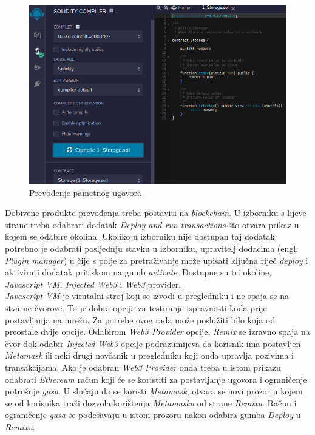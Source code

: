 \documentclass[times, utf8, zavrsni]{fer}
\begin{document}
\begin{figure}[ht]
  \includegraphics[width=\textwidth]{remixcompiled.png}
  \caption{Prevođenje pametnog ugovora}
  \centering
  \vfill
\end{figure}

\pagebreak

Dobivene produkte prevođenja treba postaviti na \emph{blockchain}. U izborniku s lijeve strane treba odabrati dodatak \emph{Deploy and run transactions} što otvara
prikaz u kojem se odabire okolina. Ukoliko u izborniku nije dostupan taj dodatak potrebno je odabrati posljednju stavku u izborniku, upravitelj dodacima (engl. \emph{Plugin manager})
u čije s polje za pretraživanje može upisati ključna riječ \emph{deploy} i aktivirati dodatak pritiskom na gumb \emph{activate}.
Dostupne su tri okoline, \emph{Javascript VM, Injected Web3} i \emph{Web3} provider. \\
\emph{Javascript VM} je virutalni stroj koji se izvodi u pregledniku i ne spaja se na stvarne čvorove. To je dobra opcija za testiranje ispravnosti koda prije postavljanja
na mrežu. Za potrebe ovog rada može poslužiti bilo koja od preostale dvije opcije. Odabirom \emph{Web3 Provider} opcije, \emph{Remix} se izravno spaja na čvor dok odabir
\emph{Injected Web3} opcije podrazumijeva da korisnik ima postavljen \emph{Metamask} ili neki drugi novčanik u pregledniku koji onda upravlja pozivima i transakcijama.
Ako je odabran \emph{Web3 Provider} onda treba u istom prikazu odabrati \emph{Ethereum} račun koji će se koristiti za postavljanje ugovora i ograničenje potrošnje
\emph{gasa}. U slučaju da se koristi \emph{Metamask}, otvara se novi prozor u kojem se od korisnika traži dozvola korištenja \emph{Metamaska} od strane \emph{Remixa}.
Račun i ograničenje \emph{gasa} se podešavaju u istom prozoru nakon odabira gumba \emph{Deploy} u \emph{Remixu}. 
\end{document}
